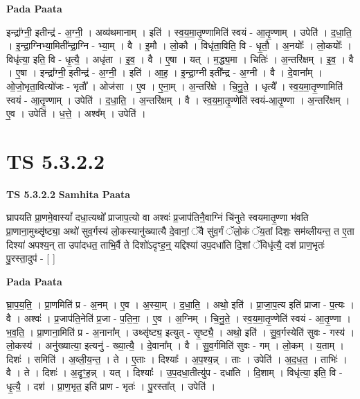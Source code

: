 \documentclass[17pt]{extarticle}
\begin{document}
\textbf{Pada Paata} \newline

इन्द्रा᳚ग्नी॒ इतीन्द्र॑ - अ॒ग्नी॒ । अव्य॑थमानाम् । इति॑ । स्व॒य॒मा॒तृ॒ण्णामिति॑ स्वयं - आ॒तृ॒ण्णाम् । उपेति॑ । द॒धा॒ति॒ । इ॒न्द्रा॒ग्निभ्या॒मिती᳚न्द्रा॒ग्नि - भ्या॒म् । वै । इ॒मौ । लो॒कौ । विधृ॑ता॒विति॒ वि - धृ॒तौ॒ । अ॒नयोः᳚ । लो॒कयोः᳚ । विधृ॑त्या॒ इति॒ वि - धृ॒त्यै॒ । अधृ॑ता । इ॒व॒ । वै । ए॒षा । यत् । म॒द्ध्य॒मा । चितिः॑ । अ॒न्तरि॑क्षम् । इ॒व॒ । वै । ए॒षा । इन्द्रा᳚ग्नी॒ इतीन्द्र॑ - अ॒ग्नी॒ । इति॑ । आ॒ह॒ । इ॒न्द्रा॒ग्नी इती᳚न्द्र - अ॒ग्नी । वै । दे॒वाना᳚म् । ओ॒जो॒भृता॒वित्यो॑जः - भृतौ᳚ । ओज॑सा । ए॒व । ए॒ना॒म् । अ॒न्तरि॑क्षे । चि॒नु॒ते॒ । धृत्यै᳚ । स्व॒य॒मा॒तृ॒ण्णामिति॑ स्वयं - आ॒तृ॒ण्णाम् । उपेति॑ । द॒धा॒ति॒ । अ॒न्तरि॑क्षम् । वै । स्व॒य॒मा॒तृ॒ण्णेति॑ स्वयं-आ॒तृ॒ण्णा । अ॒न्तरि॑क्षम् । ए॒व । उपेति॑ । ध॒त्ते॒ । अश्व᳚म् । उपेति॑ ।  \newline




\section*{ TS 5.3.2.2 }

\textbf{TS 5.3.2.2 } \newline
\textbf{Samhita Paata} \newline

घ्रापयति प्रा॒णमे॒वास्यां᳚ दधा॒त्यथो᳚ प्राजाप॒त्यो वा अश्वः॑ प्र॒जाप॑तिनै॒वाग्निं चि॑नुते स्वयमातृ॒ण्णा भ॑वति प्रा॒णाना॒मुथ्सृ॑ष्ट्या॒ अथो॑ सुव॒र्गस्य॑ लो॒कस्यानु॑ख्यात्यै दे॒वानां॒ ॅवै सु॑व॒र्गं ॅलो॒कं ॅय॒तां दिशः॒ सम॑व्लीयन्त॒ त ए॒ता दिश्या॑ अपश्य॒न् ता उपा॑दधत॒ ताभि॒र्वै ते दिशो॑ऽदृꣳह॒न्॒ यद्दिश्या॑ उप॒दधा॑ति दि॒शां ॅविधृ॑त्यै॒ दश॑ प्राण॒भृतः॑ पु॒रस्ता॒दुप॑ - [  ] \newline

\textbf{Pada Paata} \newline

घ्रा॒प॒य॒ति॒ । प्रा॒णमिति॑ प्र - अ॒नम् । ए॒व । अ॒स्या॒म् । द॒धा॒ति॒ । अथो॒ इति॑ । प्रा॒जा॒प॒त्य इति॑ प्राजा - प॒त्यः । वै । अश्वः॑ । प्र॒जाप॑ति॒नेति॑ प्र॒जा - प॒ति॒ना॒ । ए॒व । अ॒ग्निम् । चि॒नु॒ते॒ । स्व॒य॒मा॒तृ॒ण्णेति॑ स्वयं - आ॒तृ॒ण्णा । भ॒व॒ति॒ । प्रा॒णाना॒मिति॑ प्र - अ॒नाना᳚म् । उथ्सृ॑ष्ट्य॒ इत्युत् - सृ॒ष्ट्यै॒ । अथो॒ इति॑ । सु॒व॒र्गस्येति॑ सुवः - गस्य॑ । लो॒कस्य॑ । अनु॑ख्यात्या॒ इत्यनु॑ - ख्या॒त्यै॒ । दे॒वाना᳚म् । वै । सु॒व॒र्गमिति॑ सुवः - गम् । लो॒कम् । य॒ताम् । दिशः॑ । समिति॑ । अ॒व्ली॒य॒न्त॒ । ते । ए॒ताः । दिश्याः᳚ । अ॒प॒श्य॒न्न् । ताः । उपेति॑ । अ॒द॒ध॒त॒ । ताभिः॑ । वै । ते । दिशः॑ । अ॒दृꣳ॒॒ह॒न्न् । यत् । दिश्याः᳚ । उ॒प॒दधा॒तीत्यु॑प - दधा॑ति । दि॒शाम् । विधृ॑त्या॒ इति॒ वि - धृ॒त्यै॒ । दश॑ । प्रा॒ण॒भृत॒ इति॑ प्राण - भृतः॑ । पु॒रस्ता᳚त् । उपेति॑ ।  \newline
\end{document}
